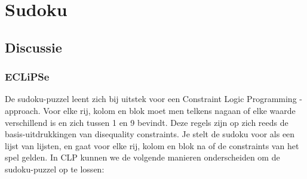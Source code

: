\section{Sudoku}

\subsection{Discussie}

\subsubsection{ECLiPSe}
De sudoku-puzzel leent zich bij uitstek voor een Constraint Logic Programming - approach.
Voor elke rij, kolom en blok moet men telkens nagaan of elke waarde verschillend is en zich
tussen 1 en 9 bevindt. Deze regels zijn op zich reeds de basis-uitdrukkingen van disequality
constraints. Je stelt de sudoku voor als een lijst van lijsten, en gaat voor elke rij,
kolom en blok na of de constraints van het spel gelden.
In CLP kunnen we de volgende manieren onderscheiden om de sudoku-puzzel
op te lossen:
